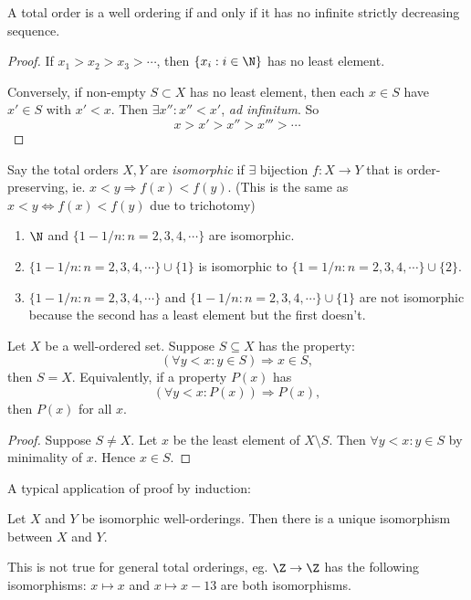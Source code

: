\documentclass[a4paper]{article}
\begin{document}
\begin{prop}
  A total order is a well ordering if and only if it has no infinite strictly decreasing sequence.
\end{prop}

\begin{proof}
  If $x_1 > x_2 > x_3 > \cdots$, then $\{x_i: i\in \N\}$ has no least element.

  Conversely, if non-empty $S\subset X$ has no least element, then each $x\in S$ have $x'\in S$ with $x' < x$. Then $\exists x'': x'' < x'$, \emph{ad infinitum}. So 
  \[
    x > x' > x'' > x''' > \cdots
  \]
\end{proof}

\begin{defi}
  Say the total orders $X, Y$ are \emph{isomorphic} if $\exists$ bijection $f: X\to Y$ that is order-preserving, ie. $x < y \Rightarrow  f(x) < f(y)$. (This is the same as $x < y \Leftrightarrow f(x) < f(y)$ due to trichotomy)
\end{defi}

\begin{eg}\leavevmode
\begin{enumerate}
  \item $\N$ and $\{1 - 1/n: n = 2, 3, 4, \cdots\}$ are isomorphic.
  \item $\{1 - 1/n:n = 2, 3, 4, \cdots\}\cup \{1\}$ is isomorphic to $\{1 = 1/n: n = 2, 3, 4, \cdots\} \cup \{2\}$.
  \item $\{1 - 1/n: n = 2, 3, 4, \cdots\}$ and $\{1 - 1/n: n = 2, 3, 4, \cdots\}\cup \{1\}$ are not isomorphic because the second has a least element but the first doesn't.
\end{enumerate}
\end{eg}

\begin{prop}
  Let $X$ be a well-ordered set. Suppose $S \subseteq X$ has the property:
  \[
    (\forall y < x: y\in S) \Rightarrow x\in S,
  \]
  then $S = X$.
  Equivalently, if a property $P(x)$ has
  \[
    (\forall y < x: P(x))\Rightarrow P(x),
  \]
  then $P(x)$ for all $x$.
\end{prop}

\begin{proof}
  Suppose $S\not=X$. Let $x$ be the least element of $X\setminus S$. Then $\forall y < x: y\in S$ by minimality of $x$. Hence $x\in S$.
\end{proof}

A typical application of proof by induction:
\begin{prop}
  Let $X$ and $Y$ be isomorphic well-orderings. Then there is a unique isomorphism between $X$ and $Y$.

  \note This is not true for general total orderings, eg. $\Z\to \Z$ has the following isomorphisms: $x\mapsto x$ and $x\mapsto x - 13$ are both isomorphisms.
\end{prop}
\end{document}

